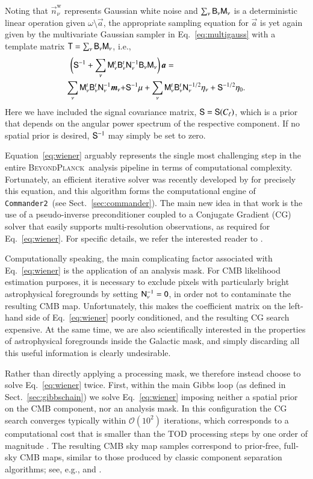 \documentclass[twocolumn]{aa}
\def\commandertwo{\texttt{Commander2}}
\newcommand{\n}[0]{\vec{n}}
\renewcommand{\a}[0]{\vec{a}}
\newcommand{\m}[0]{\vec{m}}
\newcommand{\B}[0]{\tens{B}}
\newcommand{\T}[0]{\tens{T}}
\newcommand{\N}[0]{\tens{N}}
\newcommand{\M}[0]{\tens{M}}
\renewcommand{\S}[0]{\tens{S}}
\newcommand{\BP}{\textsc{BeyondPlanck}}
\begin{document}
Noting that $\n^{\mathrm{w}}_{\nu}$ represents Gaussian white noise
and $\sum_{\nu}\B_{\nu}\M_{\nu}$ is a deterministic linear operation
given $\omega\setminus\a$, the appropriate sampling equation for $\a$
is yet again given by the multivariate Gaussian sampler in
Eq.~\eqref{eq:multigauss} with a template matrix $\T = \sum_{\nu}\B_{\nu}\M_{\nu}$,
i.e.,
\begin{equation}
    \begin{split}
\biggl(\S^{-1} +
\sum_{\nu}\M^t_{\nu}\B^t_{\nu}&\N_{\nu}^{-1}\B_{\nu}\M_{\nu}\biggr)\,\a
= \\\sum_\nu\M_\nu^t\B_{\nu}^t\N_\nu^{-1}\m_{\nu} + &\S^{-1}\mu + \sum_{\nu}\M_{\nu}^t\B_{\nu}^t\N_{\nu}^{-1/2}\eta_{\nu} +
\S^{-1/2}\eta_{0}.
\label{eq:wiener}
    \end{split}
\end{equation}
Here we have included the signal covariance matrix, $\S=\S(C_{\ell})$,
which is a prior that depends on the angular power spectrum of the
respective component. If no spatial prior is desired, $\S^{-1}$ may
simply be set to zero. 

Equation~\eqref{eq:wiener} arguably represents the single most
challenging step in the entire \BP\ analysis pipeline in terms of
computational complexity. Fortunately, an efficient iterative solver
was recently developed by \citet{seljebotn:2019} for precisely this
equation, and this algorithm forms the computational engine of
\commandertwo\ (see Sect.~\ref{sec:commander}). The main new idea in
that work is the use of a pseudo-inverse preconditioner coupled to a
Conjugate Gradient (CG) solver that easily supports multi-resolution
observations, as required for Eq.~\eqref{eq:wiener}. For specific
details, we refer the interested reader to \citet{seljebotn:2019}.

Computationally speaking, the main complicating factor associated with
Eq.~\eqref{eq:wiener} is the application of an analysis mask. For CMB
likelihood estimation purposes, it is necessary to exclude pixels with
particularly bright astrophysical foregrounds by setting
$\N_{\nu}^{-1}=\tens 0$, in order not to contaminate the resulting CMB
map. Unfortunately, this makes the coefficient matrix on the left-hand
side of Eq.~\eqref{eq:wiener} poorly conditioned, and the resulting CG
search expensive. At the same time, we are also scientifically
interested in the properties of astrophysical foregrounds inside the Galactic
mask, and simply discarding all this useful information is clearly
undesirable.

Rather than directly applying a processing mask, we therefore instead
choose to solve Eq.~\eqref{eq:wiener} twice. First, within the main
Gibbs loop (as defined in Sect.~\ref{sec:gibbschain}) we solve
Eq.~\eqref{eq:wiener} imposing neither a spatial prior on the CMB
component, nor an analysis mask. In this configuration the CG search
converges typically within $\mathcal{O}(10^2)$ iterations, which
corresponds to a computational cost that is smaller than the TOD
processing steps by one order of magnitude \citep{bp03}. The resulting
CMB sky map samples correspond to prior-free, full-sky CMB maps,
similar to those produced by classic component separation algorithms;
see, e.g., \citet{planck2014-a11} and \citet{planck2016-l04}.
\end{document}
